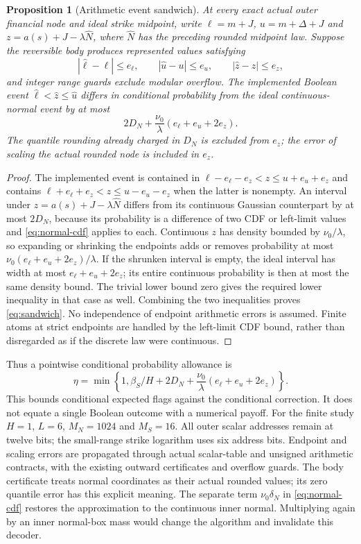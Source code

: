 \documentclass[11pt]{article}
\newtheorem{proposition}[theorem]{Proposition}
\begin{document}
\begin{proposition}[Arithmetic event sandwich]
At every exact actual outer financial node and ideal strike midpoint,
write $\ell=m+J$, $u=m+\Delta+J$ and
$z=a(s)+J-\lambda\widehat N$, where $\widehat N$ has the preceding
rounded midpoint law. Suppose the reversible body produces represented
values satisfying
\[
 |\widehat\ell-\ell|\leq e_\ell,\qquad
 |\widehat u-u|\leq e_u,\qquad
 |\widehat z-z|\leq e_z,
\]
and integer range guards exclude modular overflow. The implemented
Boolean event $\widehat\ell<\widehat z\leq\widehat u$ differs in
conditional probability from the ideal continuous-normal event by at most
\[
 2D_N+\frac{\nu_0}{\lambda}(e_\ell+e_u+2e_z).
 \tag{S4}\label{eq:sandwich}
\]
The quantile rounding already charged in $D_N$ is excluded from $e_z$;
the error of scaling the actual rounded node is included in $e_z$.
\end{proposition}
\begin{proof}
The implemented event is contained in
$\ell-e_\ell-e_z<z\leq u+e_u+e_z$ and contains
$\ell+e_\ell+e_z<z\leq u-e_u-e_z$ when the latter is nonempty.
An interval under $z=a(s)+J-\lambda\widehat N$ differs from its
continuous Gaussian counterpart by at most $2D_N$, because its probability
is a difference of two CDF or left-limit values and
\eqref{eq:normal-cdf} applies to each. Continuous $z$ has density bounded
by $\nu_0/\lambda$, so expanding or shrinking the endpoints adds or
removes probability at most
$\nu_0(e_\ell+e_u+2e_z)/\lambda$.
If the shrunken interval is empty, the ideal interval has width at most
$e_\ell+e_u+2e_z$; its entire continuous probability is then at most
the same density bound. The trivial lower bound zero gives the required
lower inequality in that case as well. Combining the two inequalities
proves \eqref{eq:sandwich}. No independence of endpoint arithmetic errors
is assumed. Finite atoms at strict endpoints are handled by the left-limit
CDF bound, rather than disregarded as if the discrete law were continuous.
\end{proof}

Thus a pointwise conditional probability allowance is
\[
 \eta=\min\left\{1,
   \beta_S/H+2D_N+
   \frac{\nu_0}{\lambda}(e_\ell+e_u+2e_z)\right\}.
 \tag{S5}\label{eq:eta}
\]
This bounds conditional expected flags against the conditional correction.
It does not equate a single Boolean outcome with a numerical payoff.
For the finite study $H=1$, $L=6$, $M_N=1024$ and $M_S=16$.
All outer scalar addresses remain at twelve bits; the small-range strike
logarithm uses six address bits. Endpoint and scaling errors are propagated
through actual scalar-table and unsigned arithmetic contracts, with the
existing outward certificates and overflow guards. The body certificate
treats normal coordinates as their actual rounded values; its zero
quantile error has this explicit meaning. The separate term
$\nu_0\delta_N$ in \eqref{eq:normal-cdf} restores the approximation to
the continuous inner normal. Multiplying again by an inner normal-box
mass would change the algorithm and invalidate this decoder.
\end{document}
